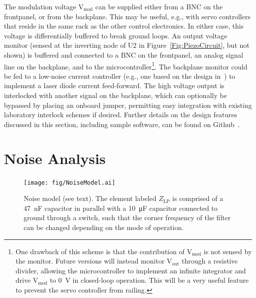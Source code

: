 \documentclass[aip,rsi,reprint]{revtex4-1} %
\begin{document}
The modulation voltage $\text{V}_\text{mod}$ can be supplied either from a BNC on the frontpanel, or from the backplane.
This may be useful, e.g., with servo controllers that reside in the same rack as the other control electronics.
In either case, this voltage is differentially buffered to break ground loops.
An output voltage monitor (sensed at the inverting node of U2 in Figure~\ref{Fig:PiezoCircuit}, but not shown) is buffered and connected to a BNC on the frontpanel, an analog signal line on the backplane, and to the microcontroller\footnote{One drawback of this scheme is that the contribution of $\text{V}_\text{mod}$ is not sensed by the monitor. Future versions will instead monitor $\text{V}_\text{out}$ through a resistive divider, allowing the microcontroller to implement an infinite integrator and drive $\text{V}_\text{mod}$ to \SI{0}{\volt} in closed-loop operation. This will be a very useful feature to prevent the servo controller from railing.}.
The backplane monitor could be fed to a low-noise current controller (e.g., one based on the design in~\cite{Erickson2008a}) to implement a laser diode current feed-forward.
The high voltage output is interlocked with another signal on the backplane, which can optionally be bypassed by placing an onboard jumper, permitting easy integration with existing laboratory interlock schemes if desired.
Further details on the design features discussed in this section, including sample software, can be found on Github~\cite{DesignFiles}.

\section{Noise Analysis}
\label{Sec:NoiseAnalysis}

\begin{figure}[t]
\texttt{[image: fig/NoiseModel.ai]}
\caption{Noise model (see text). The element labeled $Z_\text{LP}$ is comprised of a \SI{47}{\nano\farad} capacitor in parallel with a \SI{10}{\micro\farad} capacitor connected to ground through a switch, such that the corner frequency of the filter can be changed depending on the mode of operation. %
\label{Fig:NoiseModel}}
\end{figure}
\end{document}
